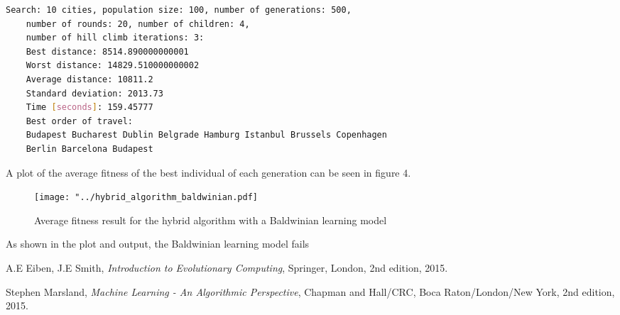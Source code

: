 \documentclass{article}
\begin{document}
\begin{lstlisting}[language=bash]
	Search: 10 cities, population size: 100, number of generations: 500, 
	number of rounds: 20, number of children: 4, 
	number of hill climb iterations: 3: 
	Best distance: 8514.890000000001
	Worst distance: 14829.510000000002
	Average distance: 10811.2
	Standard deviation: 2013.73
	Time [seconds]: 159.45777
	Best order of travel: 
	Budapest Bucharest Dublin Belgrade Hamburg Istanbul Brussels Copenhagen 
	Berlin Barcelona Budapest

\end{lstlisting}
\noindent
A plot of the average fitness of the best individual of each generation can be seen in figure 4.
\begin{figure}[H]
\begin{center}
\texttt{[image: "../hybrid\_algorithm\_baldwinian.pdf]}
\caption{Average fitness result for the hybrid algorithm with a Baldwinian learning model}
\end{center}
\end{figure}
As shown in the plot and output, the Baldwinian learning model fails
\begin{thebibliography}{9}

  A.E Eiben, J.E Smith,
  \textit{Introduction to Evolutionary Computing},
  Springer, London,
  2nd edition,
  2015.
  
  Stephen Marsland,
  \textit{Machine Learning - An Algorithmic Perspective},
  Chapman and Hall/CRC, Boca Raton/London/New York,
  2nd edition,
  2015.

\end{thebibliography}
\end{document}
